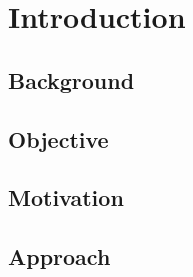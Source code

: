 \chapter{Introduction}

\section{Background}
\lipsum[1]

\section{Objective}
\lipsum[1]

\section{Motivation}
\lipsum[1]

\section{Approach}
\lipsum[1]